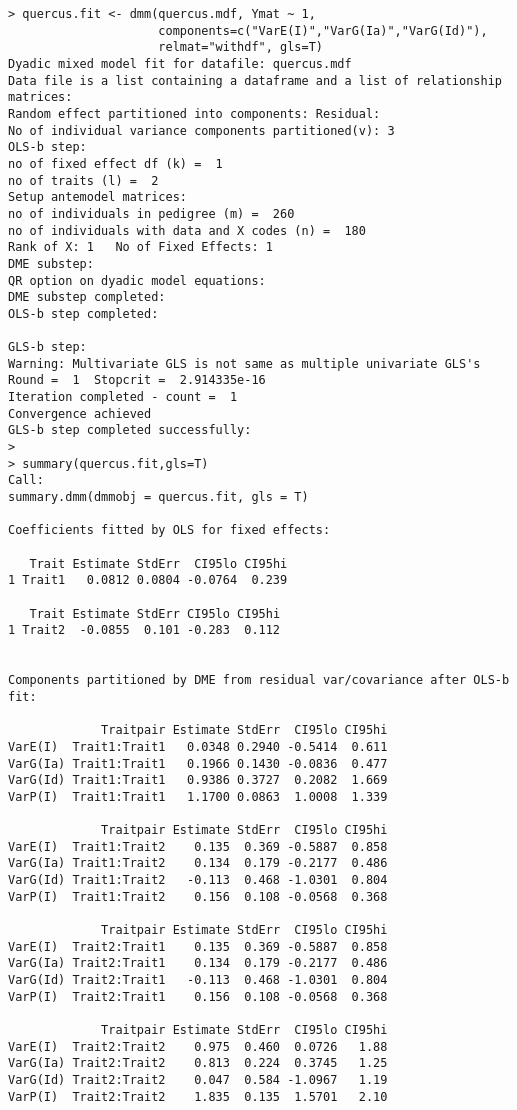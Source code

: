 \documentclass[titlepage]{article}  %
\begin{document}
\begin{verbatim}
> quercus.fit <- dmm(quercus.mdf, Ymat ~ 1,
                     components=c("VarE(I)","VarG(Ia)","VarG(Id)"),
                     relmat="withdf", gls=T)
Dyadic mixed model fit for datafile: quercus.mdf  
Data file is a list containing a dataframe and a list of relationship matrices:
Random effect partitioned into components: Residual:
No of individual variance components partitioned(v): 3 
OLS-b step:
no of fixed effect df (k) =  1 
no of traits (l) =  2 
Setup antemodel matrices:
no of individuals in pedigree (m) =  260 
no of individuals with data and X codes (n) =  180 
Rank of X: 1   No of Fixed Effects: 1 
DME substep:
QR option on dyadic model equations:
DME substep completed:
OLS-b step completed:

GLS-b step:
Warning: Multivariate GLS is not same as multiple univariate GLS's
Round =  1  Stopcrit =  2.914335e-16 
Iteration completed - count =  1 
Convergence achieved
GLS-b step completed successfully:
> 
> summary(quercus.fit,gls=T)
Call:
summary.dmm(dmmobj = quercus.fit, gls = T)

Coefficients fitted by OLS for fixed effects:

   Trait Estimate StdErr  CI95lo CI95hi
1 Trait1   0.0812 0.0804 -0.0764  0.239

   Trait Estimate StdErr CI95lo CI95hi
1 Trait2  -0.0855  0.101 -0.283  0.112


Components partitioned by DME from residual var/covariance after OLS-b fit:

             Traitpair Estimate StdErr  CI95lo CI95hi
VarE(I)  Trait1:Trait1   0.0348 0.2940 -0.5414  0.611
VarG(Ia) Trait1:Trait1   0.1966 0.1430 -0.0836  0.477
VarG(Id) Trait1:Trait1   0.9386 0.3727  0.2082  1.669
VarP(I)  Trait1:Trait1   1.1700 0.0863  1.0008  1.339

             Traitpair Estimate StdErr  CI95lo CI95hi
VarE(I)  Trait1:Trait2    0.135  0.369 -0.5887  0.858
VarG(Ia) Trait1:Trait2    0.134  0.179 -0.2177  0.486
VarG(Id) Trait1:Trait2   -0.113  0.468 -1.0301  0.804
VarP(I)  Trait1:Trait2    0.156  0.108 -0.0568  0.368

             Traitpair Estimate StdErr  CI95lo CI95hi
VarE(I)  Trait2:Trait1    0.135  0.369 -0.5887  0.858
VarG(Ia) Trait2:Trait1    0.134  0.179 -0.2177  0.486
VarG(Id) Trait2:Trait1   -0.113  0.468 -1.0301  0.804
VarP(I)  Trait2:Trait1    0.156  0.108 -0.0568  0.368

             Traitpair Estimate StdErr  CI95lo CI95hi
VarE(I)  Trait2:Trait2    0.975  0.460  0.0726   1.88
VarG(Ia) Trait2:Trait2    0.813  0.224  0.3745   1.25
VarG(Id) Trait2:Trait2    0.047  0.584 -1.0967   1.19
VarP(I)  Trait2:Trait2    1.835  0.135  1.5701   2.10


\end{verbatim}
\end{document}
